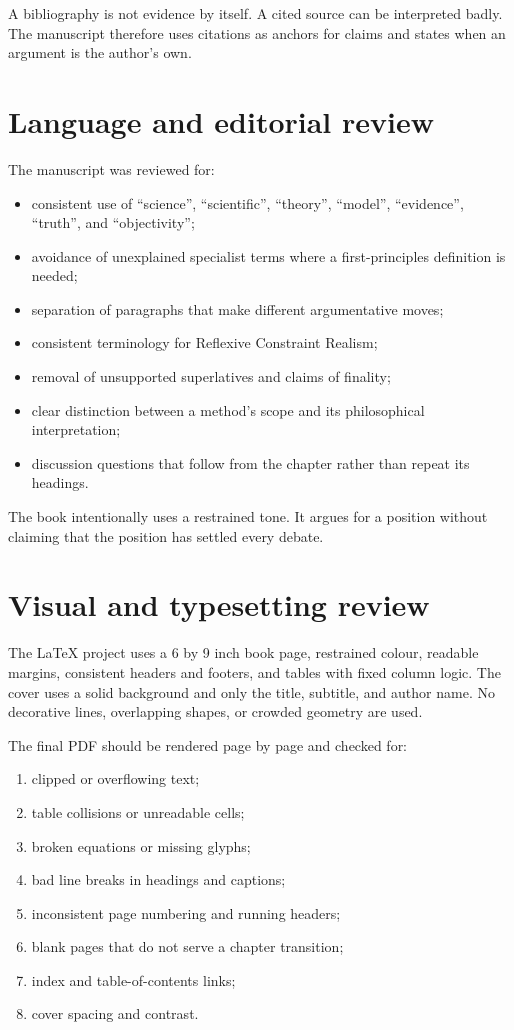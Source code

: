 A bibliography is not evidence by itself. A cited source can be interpreted
badly. The manuscript therefore uses citations as anchors for claims and
states when an argument is the author's own.

\section{Language and editorial review}

The manuscript was reviewed for:

\begin{itemize}
\item consistent use of \enquote{science}, \enquote{scientific},
\enquote{theory}, \enquote{model}, \enquote{evidence}, \enquote{truth}, and
\enquote{objectivity};
\item avoidance of unexplained specialist terms where a first-principles
definition is needed;
\item separation of paragraphs that make different argumentative moves;
\item consistent terminology for Reflexive Constraint Realism;
\item removal of unsupported superlatives and claims of finality;
\item clear distinction between a method's scope and its philosophical
interpretation;
\item discussion questions that follow from the chapter rather than repeat its
headings.
\end{itemize}

The book intentionally uses a restrained tone. It argues for a position without
claiming that the position has settled every debate.

\section{Visual and typesetting review}

The LaTeX project uses a 6 by 9 inch book page, restrained colour, readable
margins, consistent headers and footers, and tables with fixed column logic.
The cover uses a solid background and only the title, subtitle, and author
name. No decorative lines, overlapping shapes, or crowded geometry are used.

The final PDF should be rendered page by page and checked for:

\begin{enumerate}
\item clipped or overflowing text;
\item table collisions or unreadable cells;
\item broken equations or missing glyphs;
\item bad line breaks in headings and captions;
\item inconsistent page numbering and running headers;
\item blank pages that do not serve a chapter transition;
\item index and table-of-contents links;
\item cover spacing and contrast.
\end{enumerate}

